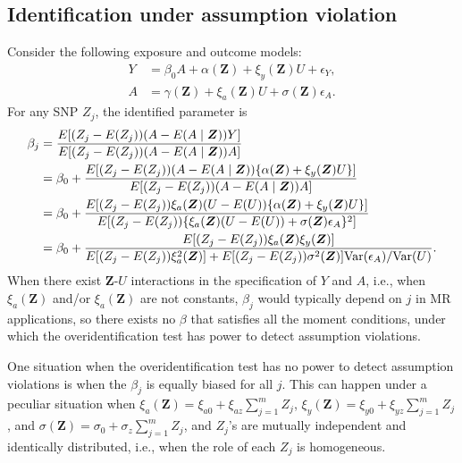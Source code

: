 \documentclass[12pt]{article}
\begin{document}
{\subsection{Identification under assumption violation}
 Consider the following exposure and outcome models:
 \begin{align*}
 	Y&= \beta_0 A + \alpha (\bm Z) + \xi_y (\bm Z) U + \epsilon_Y, \\ 
 	A&= \gamma (\bm Z) + \xi_a(\bm Z) U + \sigma(\bm Z) \epsilon_A.
 \end{align*}
 For any SNP $Z_j$, the identified parameter is 
 \begin{align}
 	\begin{split}
	\beta_j &= \frac{E[ (Z_j - E(Z_j) ) (A - E(A\mid \bm Z)) Y ]}{E[ (Z_j - E(Z_j) ) (A - E(A\mid \bm Z)) A ]} \\
& = \beta_0 +  \frac{E[ (Z_j - E(Z_j) ) (A - E(A\mid \bm Z)) \{ \alpha (\bm Z) + \xi_y (\bm Z) U \} ]}{E[ (Z_j - E(Z_j) ) (A - E(A\mid \bm Z)) A ]}   \\
& =  \beta_0 +   \frac{E[ (Z_j - E(Z_j) )  \xi_a(\bm Z) (U - E(U))  \{ \alpha (\bm Z) + \xi_y (\bm Z) U \} ]}{E[ (Z_j - E(Z_j) ) \{\xi_a(\bm Z) (U - E(U)) + \sigma(\bm Z) \epsilon_A \}^2 ]}   \\
& = \beta_0 +   \frac{E[ (Z_j - E(Z_j) )  \xi_a(\bm Z)  \xi_y (\bm Z)   ]  }{E[ (Z_j - E(Z_j) ) \xi_a^2(\bm Z) ]   +  E[ (Z_j - E(Z_j) ) \sigma^2(\bm Z)] {\rm Var} ( \epsilon_A)/{\rm Var} ( U)  }.
 	\end{split} \label{eq: assumption violation}
 \end{align}
 When there exist $\bm Z$-$U$ interactions in the specification of $Y$ and $A$, i.e., when $\xi_a(\bm Z)$ and/or $\xi_a(\bm Z)$ are not constants, $\beta_j$ would typically 
 depend on $j$ in MR applications, so there exists no $\beta$ that satisfies all the moment conditions, under which the overidentification test has power to detect assumption violations. 
 
 One situation when the overidentification test has no power to detect assumption violations is when the $\beta_j$ is equally biased for all $j$. This can happen under a peculiar situation when $\xi_a(\bm Z) = \xi_{a0} +  \xi_{az}   \sum_{j=1}^m Z_j $,  $\xi_y(\bm Z) = \xi_{y0} +  \xi_{yz}   \sum_{j=1}^m Z_j $, and  $\sigma(\bm Z) =\sigma_0 + \sigma_z  \sum_{j=1}^m Z_j $, and  $Z_j$'s are mutually independent and identically distributed, i.e., when the role of each $Z_j$ is homogeneous. 
 
 
 
}
\end{document}
